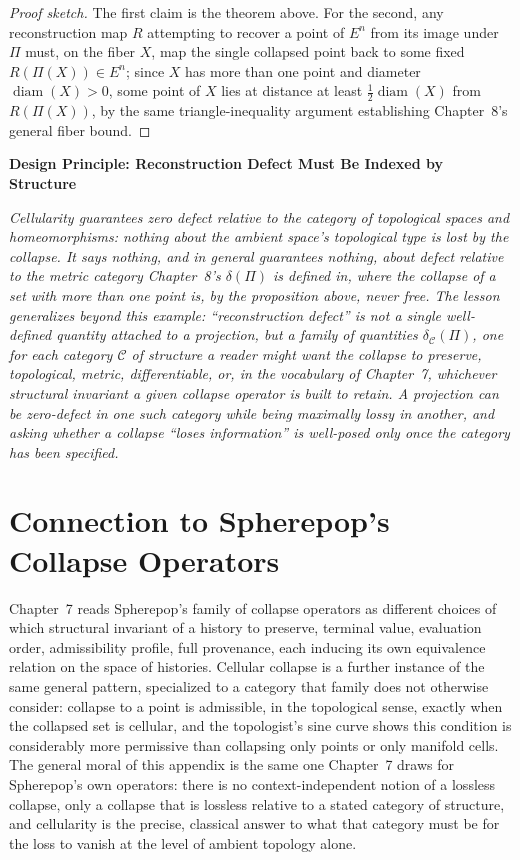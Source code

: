 \documentclass[11pt,fleqn]{book}
\numberwithin{equation}{chapter}
\newenvironment{principle}[1]
  {\begin{principleEnv}
   \noindent\textbf{Design Principle: #1}\par\smallskip\itshape}
  {\end{principleEnv}}
\theoremstyle{plain}
\theoremstyle{definition}
\theoremstyle{remark}
\providecommand{\enquote}[1]{``#1''}
\begin{document}
\begin{proof}[Proof sketch]
The first claim is the theorem above. For the second, any reconstruction map \(R\) attempting to recover a point of \(E^n\) from its image under \(\Pi\) must, on the fiber \(X\), map the single collapsed point back to some fixed \(R(\Pi(X))\in E^n\); since \(X\) has more than one point and diameter \(\operatorname{diam}(X)>0\), some point of \(X\) lies at distance at least \(\tfrac12\operatorname{diam}(X)\) from \(R(\Pi(X))\), by the same triangle-inequality argument establishing Chapter~8's general fiber bound.
\end{proof}

\begin{principle}{Reconstruction Defect Must Be Indexed by Structure}
Cellularity guarantees zero defect relative to the category of topological spaces and homeomorphisms: nothing about the ambient space's topological type is lost by the collapse. It says nothing, and in general guarantees nothing, about defect relative to the metric category Chapter~8's \(\delta(\Pi)\) is defined in, where the collapse of a set with more than one point is, by the proposition above, never free. The lesson generalizes beyond this example: \enquote{reconstruction defect} is not a single well-defined quantity attached to a projection, but a family of quantities \(\delta_{\mathcal C}(\Pi)\), one for each category \(\mathcal C\) of structure a reader might want the collapse to preserve, topological, metric, differentiable, or, in the vocabulary of Chapter~7, whichever structural invariant a given collapse operator is built to retain. A projection can be zero-defect in one such category while being maximally lossy in another, and asking whether a collapse \enquote{loses information} is well-posed only once the category has been specified.
\end{principle}

\section{Connection to Spherepop's Collapse Operators}

Chapter~7 reads Spherepop's family of collapse operators as different choices of which structural invariant of a history to preserve, terminal value, evaluation order, admissibility profile, full provenance, each inducing its own equivalence relation on the space of histories. Cellular collapse is a further instance of the same general pattern, specialized to a category that family does not otherwise consider: collapse to a point is admissible, in the topological sense, exactly when the collapsed set is cellular, and the topologist's sine curve shows this condition is considerably more permissive than collapsing only points or only manifold cells. The general moral of this appendix is the same one Chapter~7 draws for Spherepop's own operators: there is no context-independent notion of a lossless collapse, only a collapse that is lossless relative to a stated category of structure, and cellularity is the precise, classical answer to what that category must be for the loss to vanish at the level of ambient topology alone.
\end{document}
